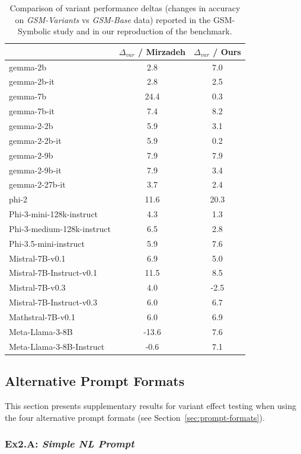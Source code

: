 \documentclass[11pt]{article}
\begin{document}
\begin{table}[H]
\centering
\small
\begin{tabular}{lcc}
\toprule
 & $\Delta_{var}$ / Mirzadeh & $\Delta_{var}$ / Ours \\
\midrule
gemma-2b & 2.8 & 7.0 \\
gemma-2b-it & 2.8 & 2.5 \\
gemma-7b & 24.4 & 0.3 \\
gemma-7b-it & 7.4 & 8.2 \\
gemma-2-2b & 5.9 & 3.1 \\
gemma-2-2b-it & 5.9 & 0.2 \\
gemma-2-9b & 7.9 & 7.9 \\
gemma-2-9b-it & 7.9 & 3.4 \\
gemma-2-27b-it & 3.7 & 2.4 \\
phi-2 & 11.6 & 20.3 \\
Phi-3-mini-128k-instruct & 4.3 & 1.3 \\
Phi-3-medium-128k-instruct & 6.5 & 2.8 \\
Phi-3.5-mini-instruct & 5.9 & 7.6 \\
Mistral-7B-v0.1 & 6.9 & 5.0 \\
Mistral-7B-Instruct-v0.1 & 11.5 & 8.5 \\
Mistral-7B-v0.3 & 4.0 & -2.5 \\
Mistral-7B-Instruct-v0.3 & 6.0 & 6.7 \\
Mathstral-7B-v0.1 & 6.0 & 6.9 \\
Meta-Llama-3-8B & -13.6 & 7.6 \\
Meta-Llama-3-8B-Instruct & -0.6 & 7.1 \\
\bottomrule
\end{tabular}
\caption{Comparison of variant performance deltas (changes in accuracy on \textit{GSM-Variants} vs \textit{GSM-Base} data) reported in the GSM-Symbolic study \citep{mirzadeh2025gsm} and in our reproduction of the benchmark.}
\label{tab:mirzadeh-comparison-deltas}
\end{table}


\newpage
\subsection{Alternative Prompt Formats}
\label{apx:prompt-formats-results}
This section presents supplementary results for variant effect testing when using the four alternative prompt formats (see Section~\ref{sec:prompt-formats}).

\subsubsection{Ex2.A: \textit{Simple NL Prompt}}
\end{document}
